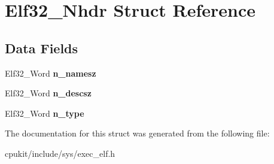 \hypertarget{structElf32__Nhdr}{}\section{Elf32\+\_\+\+Nhdr Struct Reference}
\label{structElf32__Nhdr}
\subsection*{Data Fields}
\begin{DoxyCompactItemize}
\item 
\mbox{\label{structElf32__Nhdr_a8e6389f882a5c695518a833b4c1bd9c6}} 
Elf32\+\_\+\+Word {\bfseries n\+\_\+namesz}
\item 
\mbox{\label{structElf32__Nhdr_ad83450c86fb3e14d1096a141ea705f33}} 
Elf32\+\_\+\+Word {\bfseries n\+\_\+descsz}
\item 
\mbox{\label{structElf32__Nhdr_afdab20b47522cb964500a200ceb92462}} 
Elf32\+\_\+\+Word {\bfseries n\+\_\+type}
\end{DoxyCompactItemize}


The documentation for this struct was generated from the following file\+:\begin{DoxyCompactItemize}
\item 
cpukit/include/sys/exec\+\_\+elf.\+h\end{DoxyCompactItemize}
